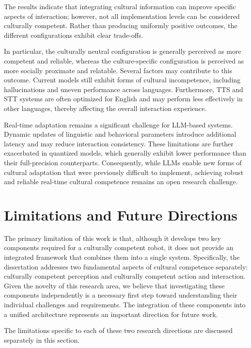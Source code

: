 The results indicate that integrating cultural information can improve specific aspects of interaction; however, not all implementation levels can be considered culturally competent. Rather than producing uniformly positive outcomes, the different configurations exhibit clear trade-offs.

In particular, the culturally neutral configuration is generally perceived as more competent and reliable, whereas the culture-specific configuration is perceived as more socially proximate and relatable. Several factors may contribute to this outcome. Current models still exhibit forms of cultural incompetence, including hallucinations and uneven performance across languages. Furthermore, TTS and STT systems are often optimized for English and may perform less effectively in other languages, thereby affecting the overall interaction experience.

Real-time adaptation remains a significant challenge for LLM-based systems. Dynamic updates of linguistic and behavioral parameters introduce additional latency and may reduce interaction consistency. These limitations are further exacerbated in quantized models, which generally exhibit lower performance than their full-precision counterparts. Consequently, while LLMs enable new forms of cultural adaptation that were previously difficult to implement, achieving robust and reliable real-time cultural competence remains an open research challenge.

\section{Limitations and Future Directions}

The primary limitation of this work is that, although it develops two key components required for a culturally competent robot, it does not provide an integrated framework that combines them into a single system. Specifically, the dissertation addresses two fundamental aspects of cultural competence separately: culturally competent perception and culturally competent action and interaction. Given the novelty of this research area, we believe that investigating these components independently is a necessary first step toward understanding their individual challenges and requirements. The integration of these components into a unified architecture represents an important direction for future work.

The limitations specific to each of these two research directions are discussed separately in this section.

